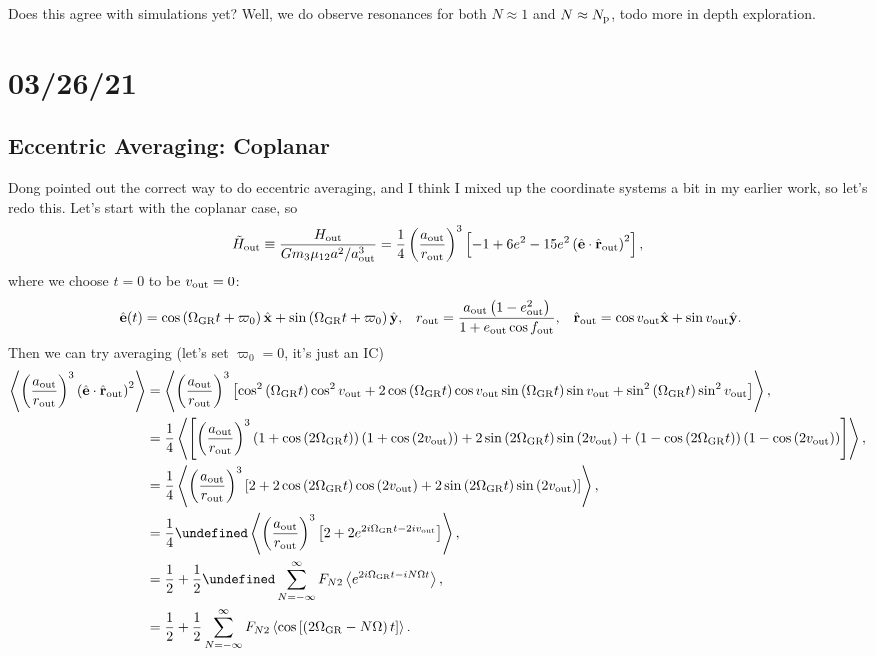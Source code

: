 \documentclass[10pt,
        usenames, %
        dvipsnames %
    ]{article}
\newcommand*{\bm}[1]{\boldsymbol{\mathbf{#1}}}
\newcommand*{\uv}[1]{\hat{\bm{#1}}}
\newcommand*{\ev}[1]{\left\langle#1\right\rangle}
\newcommand*{\p}[1]{\left(#1\right)}
\newcommand*{\s}[1]{\left[#1\right]}
\let\Re\undefined
\DeclareMathOperator{\Re}{Re}
\begin{document}
Does this agree with simulations yet? Well, we do observe resonances for both $N
\approx 1$ and $N \approx N_{\rm p}$, todo more in depth exploration.

\section{03/26/21}

\subsection{Eccentric Averaging: Coplanar}

Dong pointed out the correct way to do eccentric averaging, and I think I mixed
up the coordinate systems a bit in my earlier work, so let's redo this. Let's
start with the coplanar case, so
\begin{equation}
    \tilde{H}_{\rm out} \equiv \frac{H_{\rm out}}{Gm_3\mu_{12}a^2/a_{\rm out}^3}
        = \frac{1}{4}\p{\frac{a_{\rm out}}{r_{\rm out}}}^3 \s{
            -1 + 6e^2 - 15 e^2\p{\uv{e} \cdot \uv{r}_{\rm out}}^2},
\end{equation}
where we choose $t = 0$ to be $v_{\rm out} = 0$:
\begin{align}
    \uv{e}(t) &= \cos \p{\Omega_{\rm GR}t + \varpi_0} \uv{x} +
        \sin\p{\Omega_{\rm GR}t + \varpi_0}\uv{y},&
    r_{\rm out} &= \frac{a_{\rm out}\p{1 - e_{\rm out}^2}}{1 + e_{\rm out} \cos
        f_{\rm out}}, &
    \uv{r}_{\rm out} &= \cos v_{\rm out}\uv{x} + \sin v_{\rm out}\uv{y}.
\end{align}
Then we can try averaging (let's set $\varpi_0 = 0$, it's just an IC)
\begin{align}
    \ev{\p{\frac{a_{\rm out}}{r_{\rm out}}}^3\p{\uv{e} \cdot \uv{r}_{\rm out}}^2}
        &= \ev{\p{\frac{a_{\rm out}}{r_{\rm out}}}^3
            \s{\cos^2\p{\Omega_{\rm GR}t}\cos^2 v_{\rm out}
                + 2\cos\p{\Omega_{\rm GR}t} \cos v_{\rm out}
                    \sin \p{\Omega_{\rm GR}t} \sin v_{\rm out}
                + \sin^2\p{\Omega_{\rm GR}t} \sin^2v_{\rm out}}},\\
        &= \frac{1}{4}\ev{\s{\p{\frac{a_{\rm out}}{r_{\rm out}}}^3
            \p{1 + \cos\p{2\Omega_{\rm GR}t}}\p{1 + \cos\p{2v_{\rm out}}}
            + 2\sin\p{2\Omega_{\rm GR}t}\sin\p{2v_{\rm out}}
            + \p{1 - \cos\p{2\Omega_{\rm GR}t}}\p{1 - \cos\p{2v_{\rm out}}}}},\\
        &= \frac{1}{4}\ev{\p{\frac{a_{\rm out}}{r_{\rm out}}}^3
            \s{2 + 2\cos\p{2\Omega_{\rm GR}t}\cos\p{2v_{\rm out}}
            + 2\sin\p{2\Omega_{\rm GR}t}\sin\p{2v_{\rm out}}}},\\
        &= \frac{1}{4}\Re\ev{\p{\frac{a_{\rm out}}{r_{\rm out}}}^3\s{
            2 + 2e^{2i\Omega_{\rm GR}t - 2iv_{\rm out}}}},\\
        &= \frac{1}{2} + \frac{1}{2}\Re \sum\limits_{N = -\infty}^\infty
            F_{N2} \ev{e^{2i\Omega_{\rm GR}t - iN\Omega t}},\\
        &= \frac{1}{2} + \frac{1}{2}\sum\limits_{N = -\infty}^\infty
            F_{N2} \ev{\cos\s{\p{2\Omega_{\rm GR} - N\Omega}t}}.
\end{align}
\end{document}
